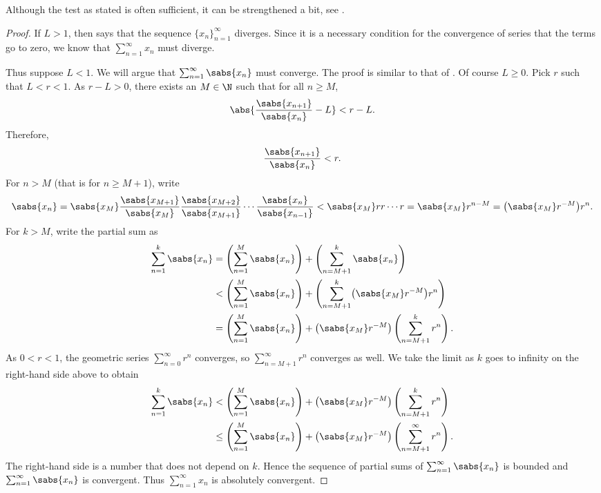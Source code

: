 Although the test as stated is often sufficient, it can be strengthened a
bit, see .

\begin{proof}
If $L > 1$, then
 says that the sequence $\{ x_n \}_{n=1}^\infty$
diverges.  Since it is a necessary condition for the convergence of series
that the terms go to zero, we know that $\sum_{n=1}^\infty x_n$ must diverge.

Thus suppose $L < 1$.
We will argue that $\sum_{n=1}^\infty \sabs{x_n}$ must converge.
The proof is similar to that of .  Of course $L \geq
0$.  
Pick
$r$ such that $L < r < 1$.  As $r-L > 0$, there exists an $M \in \N$ such that for
all $n \geq M$,
\begin{equation*}
\abs{\frac{\sabs{x_{n+1}}}{\sabs{x_n}} - L} < r-L .
\end{equation*}
Therefore,
\begin{equation*}
\frac{\sabs{x_{n+1}}}{\sabs{x_n}} < r .
\end{equation*}
For $n > M$ (that is for $n \geq M+1$),
write
\begin{equation*}
\sabs{x_n} =
\sabs{x_M}
\frac{\sabs{x_{M+1}}}{\sabs{x_{M}}}
\frac{\sabs{x_{M+2}}}{\sabs{x_{M+1}}}
\cdots
\frac{\sabs{x_{n}}}{\sabs{x_{n-1}}}
<
\sabs{x_M}
r r \cdots r = \sabs{x_M} r^{n-M} =
\bigl(\sabs{x_M} r^{-M}\bigr) r^n .
\end{equation*}
For $k > M$, write the partial sum as
\begin{equation*}
\begin{split}
\sum_{n=1}^k \sabs{x_n}
& =
\left(\sum_{n=1}^{M} \sabs{x_n} \right)
+
\left(\sum_{n=M+1}^{k} \sabs{x_n} \right)
\\
& <
\left(\sum_{n=1}^{M} \sabs{x_n} \right)
+
\left(\sum_{n=M+1}^{k} 
\bigl(\sabs{x_M} r^{-M}\bigr) r^n
\right)
\\
& =
\left(\sum_{n=1}^{M} \sabs{x_n} \right)
+
\bigl(\sabs{x_M} r^{-M}\bigr)
\left( \sum_{n=M+1}^{k} r^n \right) .
\end{split}
\end{equation*}
As $0 < r < 1$, the geometric series
$\sum_{n=0}^{\infty} r^n$ converges, so
$\sum_{n=M+1}^{\infty} r^n$ converges as well.  We take the
limit as $k$ goes to infinity on the right-hand side above to obtain
\begin{equation*}
\begin{split}
\sum_{n=1}^k \sabs{x_n}
& <
\left(\sum_{n=1}^{M} \sabs{x_n} \right)
+
\bigl(\sabs{x_M} r^{-M}\bigr)
\left( \sum_{n=M+1}^{k} r^n \right) 
\\
& \leq
\left(\sum_{n=1}^{M} \sabs{x_n} \right)
+
\bigl(\sabs{x_M} r^{-M}\bigr)
\left( \sum_{n=M+1}^{\infty} r^n \right) .
\end{split}
\end{equation*}
The right-hand side is a number that does not depend on $k$.
Hence the sequence of partial sums of $\sum_{n=1}^\infty \sabs{x_n}$ is bounded
and $\sum_{n=1}^\infty \sabs{x_n}$ is convergent.  Thus $\sum_{n=1}^\infty x_n$ is
absolutely convergent.
\end{proof}

